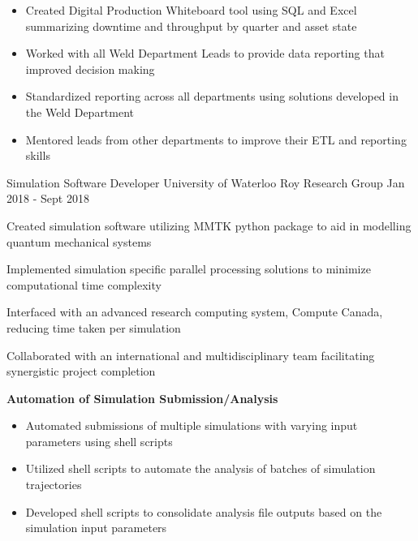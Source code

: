 \begin{cventries}
{\begin{cvitems}
        \vspace{0.05cm}
        \begin{itemize}
            \item Created Digital Production Whiteboard tool using SQL and Excel summarizing downtime and throughput by quarter and asset state
            \item Worked with all Weld Department Leads to provide data reporting that improved decision making
            \item Standardized reporting across all departments using solutions developed in the Weld Department
            \item Mentored leads from other departments to improve their ETL and reporting skills
        \end{itemize}
      \end{cvitems}
    }
  \cventry
    {Simulation Software Developer} %
    {University of Waterloo} %
    {Roy Research Group} %
    {Jan 2018 - Sept 2018} %
    {
      \begin{cvitems} %
        \item Created simulation software utilizing MMTK python package to aid in modelling quantum mechanical systems
        \item Implemented simulation specific parallel processing solutions to minimize computational time complexity
        \item Interfaced with an advanced research computing system, Compute Canada, reducing time taken per simulation
        \item Collaborated with an international and multidisciplinary team facilitating synergistic project completion
        \vspace{0.05cm}
        \item \textbf{Automation of Simulation Submission/Analysis}
        \begin{itemize}
            \item Automated submissions of multiple simulations with varying input parameters using shell scripts 
            \item Utilized shell scripts to automate the analysis of batches of simulation trajectories
            \item Developed shell scripts to consolidate analysis file outputs based on the simulation input parameters
        \end{itemize}
        \vspace{0.05cm}

\end{cvitems}}
\end{cventries}
